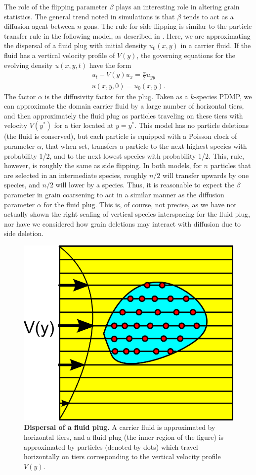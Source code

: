    The role of the flipping parameter $\beta$ plays an interesting role in altering grain statistics. The general trend noted in simulations is that $\beta$ tends to act as a diffusion agent between $n$-gons. The rule for side flipping is similar to the particle transfer rule in the following model, as described in \cite{bruus2008theoretical}.  Here, we are approximating the dispersal of a fluid plug with initial density $u_{0}(x,y)$ in a carrier fluid. If the fluid has a vertical velocity profile of $V(y)$, the governing equations for the evolving density $u(x,y,t)$ have the form
\begin{eqnarray}
u_t-V(y)u_{x} = \frac{\alpha}2 u_{yy}\\
u(x,y,0) = u_0(x,y). \nonumber
\end{eqnarray}
The factor $\alpha$ is the diffusivity factor for the plug.  Taken as a $k$-species PDMP, we can approximate the domain carrier fluid by a large number of horizontal tiers, and then approximately the fluid plug as particles traveling on these tiers with velocity $V(y^*)$ for a tier located at $y = y^*$.  This model has no particle deletions (the fluid is conserved), but each particle is equipped with a Poisson clock of parameter $\alpha$, that when set, transfers a particle  to the next highest species with probability 1/2, and to the next lowest species with probability 1/2.  This, rule, however, is roughly the same as side flipping. In both models, for $n$ particles that are selected in an intermediate species, roughly $n/2$ will transfer upwards by one species, and $n/2$ will lower by a species. Thus, it is reasonable to expect the $\beta$ parameter in grain coarsening to act in a similar manner as the diffusion parameter $\alpha$ for the fluid plug. This is, of course, not precise, as we have not actually shown the right scaling of vertical species interspacing for the fluid plug, nor have we considered how grain deletions may interact with  diffusion due to side deletion.
\begin{figure}
\hspace{130pt}\includegraphics[width=.3\textwidth]{fluidpic.png} 
\caption{\textbf{Dispersal of a fluid plug.}  A carrier fluid   is approximated by horizontal tiers, and a fluid plug (the inner region of the figure) is approximated by particles (denoted by dots) which travel horizontally on tiers corresponding to the vertical velocity profile $V(y)$.}
\end{figure}

